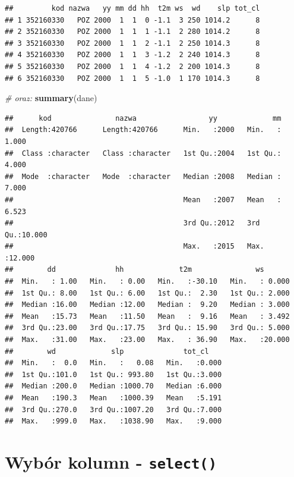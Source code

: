 \documentclass[]{book}
\newenvironment{Shaded}{\begin{snugshade}}{\end{snugshade}}
\newcommand{\KeywordTok}[1]{\textcolor[rgb]{0.13,0.29,0.53}{\textbf{#1}}}
\newcommand{\CommentTok}[1]{\textcolor[rgb]{0.56,0.35,0.01}{\textit{#1}}}
\newcommand{\NormalTok}[1]{#1}
\theoremstyle{definition}
\theoremstyle{definition}
\theoremstyle{definition}
\theoremstyle{remark}
\begin{document}
\begin{verbatim}
##         kod nazwa   yy mm dd hh  t2m ws  wd    slp tot_cl
## 1 352160330   POZ 2000  1  1  0 -1.1  3 250 1014.2      8
## 2 352160330   POZ 2000  1  1  1 -1.1  2 280 1014.2      8
## 3 352160330   POZ 2000  1  1  2 -1.1  2 250 1014.3      8
## 4 352160330   POZ 2000  1  1  3 -1.2  2 240 1014.3      8
## 5 352160330   POZ 2000  1  1  4 -1.2  2 200 1014.3      8
## 6 352160330   POZ 2000  1  1  5 -1.0  1 170 1014.3      8
\end{verbatim}

\begin{Shaded}
\begin{Highlighting}[]
\CommentTok{# oraz:}
\KeywordTok{summary}\NormalTok{(dane)}
\end{Highlighting}
\end{Shaded}

\begin{verbatim}
##      kod               nazwa                 yy             mm        
##  Length:420766      Length:420766      Min.   :2000   Min.   : 1.000  
##  Class :character   Class :character   1st Qu.:2004   1st Qu.: 4.000  
##  Mode  :character   Mode  :character   Median :2008   Median : 7.000  
##                                        Mean   :2007   Mean   : 6.523  
##                                        3rd Qu.:2012   3rd Qu.:10.000  
##                                        Max.   :2015   Max.   :12.000  
##        dd              hh             t2m               ws        
##  Min.   : 1.00   Min.   : 0.00   Min.   :-30.10   Min.   : 0.000  
##  1st Qu.: 8.00   1st Qu.: 6.00   1st Qu.:  2.30   1st Qu.: 2.000  
##  Median :16.00   Median :12.00   Median :  9.20   Median : 3.000  
##  Mean   :15.73   Mean   :11.50   Mean   :  9.16   Mean   : 3.492  
##  3rd Qu.:23.00   3rd Qu.:17.75   3rd Qu.: 15.90   3rd Qu.: 5.000  
##  Max.   :31.00   Max.   :23.00   Max.   : 36.90   Max.   :20.000  
##        wd             slp              tot_cl     
##  Min.   :  0.0   Min.   :   0.08   Min.   :0.000  
##  1st Qu.:101.0   1st Qu.: 993.80   1st Qu.:3.000  
##  Median :200.0   Median :1000.70   Median :6.000  
##  Mean   :190.3   Mean   :1000.39   Mean   :5.191  
##  3rd Qu.:270.0   3rd Qu.:1007.20   3rd Qu.:7.000  
##  Max.   :999.0   Max.   :1038.90   Max.   :9.000
\end{verbatim}

\section{\texorpdfstring{Wybór kolumn -
\texttt{select()}}{Wybór kolumn - select()}}\label{wybor-kolumn---select}
\end{document}
